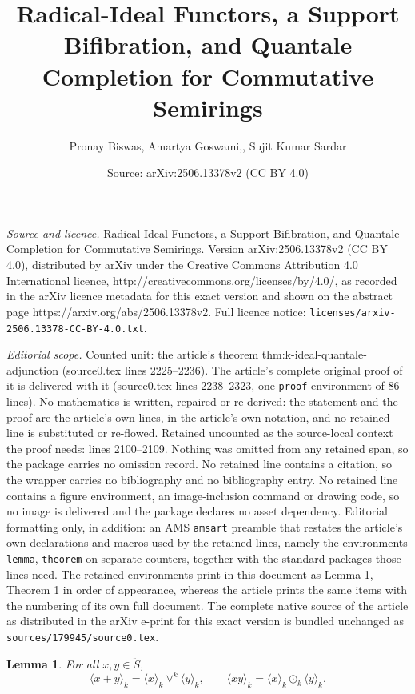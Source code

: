 \documentclass[10pt,a4paper]{amsart}
\title{Radical-Ideal Functors, a Support Bifibration, and Quantale Completion for Commutative Semirings}
\author{Pronay Biswas, Amartya Goswami,, Sujit Kumar Sardar}
\date{Source: arXiv:2506.13378v2 (CC BY 4.0)}
\newtheorem{lemma}{Lemma}
\begin{document}
\maketitle

\noindent\emph{Source and licence.} Radical-Ideal Functors, a Support Bifibration, and Quantale Completion for Commutative Semirings. Version arXiv:2506.13378v2 (CC BY 4.0), distributed by arXiv under the Creative Commons Attribution 4.0 International licence, http://creativecommons.org/licenses/by/4.0/, as recorded in the arXiv licence metadata for this exact version and shown on the abstract page https://arxiv.org/abs/2506.13378v2. Full licence notice: \texttt{licenses/arxiv-2506.13378-CC-BY-4.0.txt}.\par\smallskip

\noindent\textit{Editorial scope.} Counted unit: the article's theorem thm:k-ideal-quantale-adjunction (source0.tex lines 2225--2236). The article's complete original proof of it is delivered with it (source0.tex lines 2238--2323, one \texttt{proof} environment of 86 lines). No mathematics is written, repaired or re-derived: the statement and the proof are the article's own lines, in the article's own notation, and no retained line is substituted or re-flowed.  Retained uncounted as the source-local context the proof needs: lines 2100--2109.  Nothing was omitted from any retained span, so the package carries no omission record.  No retained line contains a citation, so the wrapper carries no bibliography and no bibliography entry.  No retained line contains a figure environment, an image-inclusion command or drawing code, so no image is delivered and the package declares no asset dependency.  Editorial formatting only, in addition: an AMS \texttt{amsart} preamble that restates the article's own declarations and macros used by the retained lines, namely the environments \texttt{lemma}, \texttt{theorem} on separate counters, together with the standard packages those lines need.  The retained environments print in this document as Lemma 1, Theorem 1 in order of appearance, whereas the article prints the same items with the numbering of its own full document.  The complete native source of the article as distributed in the arXiv e-print for this exact version is bundled unchanged as \texttt{sources/179945/source0.tex}.
\begin{lemma}\label{lem:principal-k-ideals}
For all \(x,y\in\ddot S\),
\[
\langle x+y\rangle_k
 =\langle x\rangle_k\vee^k\langle y\rangle_k,
\qquad
\langle xy\rangle_k
 =\langle x\rangle_k\odot_k\langle y\rangle_k.
\]
\end{lemma}
\end{document}

